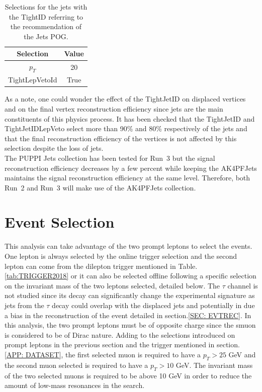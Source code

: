 \documentclass{cernatlasnote}
\begin{document}
\begin{table}[h]
\centering
\begin{tabular}{|c|c|}
  \hline
  \rowcolor{lightgray} 
  Selection & Value \\
  \hline
  $p_T$ & 20 \\
  TightLepVetoId & True \\
  \hline
\end{tabular}
    \caption{Selections for the jets with the TightID referring to the recommendation of the Jets POG\cite{TIGHTJET}.}
    \label{tab:JETSEL}
\end{table}

As a note, one could wonder the effect of the TightJetID on displaced vertices and on the final vertex reconstruction efficiency since jets are the main constituents of this physics process. It has been checked that the TightJetID and TightJetIDLepVeto select more than 90\% and 80\% respectively of the jets and that the final reconstruction efficiency of the vertices is not affected by this selection despite the loss of jets. \\

The PUPPI Jets collection has been tested for Run~3 but the signal reconstruction efficiency decreases by a few percent while keeping the AK4PFJets maintains the signal reconstruction efficiency at the same level. Therefore, both Run~2 and Run~3 will make use of the AK4PFJets collection.


\section{Event Selection}
\label{SEC: EVTSEL}

This analysis can take advantage of the two prompt leptons to select the events. One lepton is always selected by the online trigger selection and the second lepton can come from the dilepton trigger mentioned in Table.\ref{tab:TRIGGER2018} or it can also be selected offline following a specific selection on the invariant mass of the two leptons selected, detailed below. The $\tau$ channel is not studied since its decay can significantly change the experimental signature as jets from the $\tau$ decay could overlap with the displaced jets and potentially in due a bias in the reconstruction of the event detailed in section.\ref{SEC: EVTREC}. In this analysis, the two prompt leptons must be of opposite charge since the smuon is considered to be of Dirac nature.
Adding to the selections introduced on prompt leptons in the previous section and the trigger mentioned in section.\ref{APP: DATASET}, the first selected muon is required to have a $p_T > 25$ GeV and the second muon selected is required to have a $p_T > 10$ GeV. The invariant mass of the two selected muons is required to be above 10 GeV in order to reduce the amount of low-mass resonances in the search. 
\end{document}
